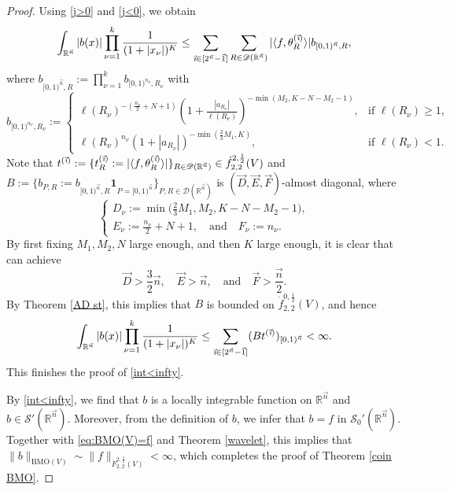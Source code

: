 \documentclass[11pt, reqno]{amsart}
\theoremstyle{definition}
\theoremstyle{remark}
\numberwithin{equation}{section}
\newcommand{\vD}{\vec D}
\newcommand{\vE}{\vec E}
\newcommand{\vF}{\vec F}
\newcommand{\vi}{\vec{\textit{\i}}}
\begin{document}
\begin{proof}
Using \eqref{j>0} and \eqref{j<0}, we obtain
\begin{equation*}
\int_{\mathbb R^{\vec n}} |b(x)| \prod_{\nu=1}^k \frac{1}{(1+|x_\nu|)^K}
\leq \sum_{\vi\in[2^{\vec n}-\vec 1]}
\sum_{R\in \mathscr D(\mathbb R^{\vec n})}
|\langle f, \theta^{(\vi)}_R\rangle|
b_{[0,1)^{\vec n}, R},
\end{equation*}
where $b_{[0,1)^{\vec n}, R}:=\prod_{\nu=1}^k b_{[0,1)^{n_\nu}, R_\nu}$ with
\begin{equation*}
b_{[0,1)^{n_\nu}, R_\nu}:=
\begin{cases}
\displaystyle\ell(R_\nu)^{-(\frac{n_\nu}2 + N+1)}  (1+\frac{|a_{R_\nu}|}{\ell(R_\nu)})^{-\min(M_2,K-N-M_2-1)},
&\text{if } \ell(R_\nu)\geq 1, \\
\ell(R_\nu)^{n_\nu} (1+|a_{R_\nu}|)^{-\min(\frac23M_1,K)},
&\text{if } \ell(R_\nu)< 1.
\end{cases}
\end{equation*}
Note that $t^{(\vi)}:=\{t_R^{(\vi)}:=|\langle f, \theta^{(\vi)}_R\rangle|\}_{R\in\mathscr D(\mathbb R^{\vec n})}
\in \dot f^{2,\frac12}_{2,2}(V)$
and $B:=\{b_{P,R}:= b_{[0,1)^{\vec n}, R} \mathbf 1_{P=[0,1)^{\vec n}}\}_{P,R\in\mathscr D(\mathbb R^{\vec n})}$
is $(\vD,\vE,\vF)$-almost diagonal, where
$$
\begin{cases}
\displaystyle D_\nu:=\min\Big(\frac23 M_1,M_2,K-N-M_2-1\Big),\\
\displaystyle E_\nu:=\frac{n_\nu}2 + N+1, \quad\text{and}\quad
F_\nu:=n_\nu.
\end{cases}
$$
By first fixing $M_1,M_2,N$ large enough, and then $K$ large enough, it is clear that can achieve
$$
\vec D>\frac 32 \vec n,\quad
\vec E>\vec n,\quad\text{and}\quad
\vec F>\frac{\vec n}{2}.
$$
By Theorem \ref{AD st}, this implies that $B$ is bounded on $\dot f^{0,\frac12}_{2,2}(V)$, and hence
$$
\int_{\mathbb R^{\vec n}} |b(x)| \prod_{\nu=1}^k \frac{1}{(1+|x_\nu|)^K}
\leq \sum_{\vi\in[2^{\vec n}-\vec 1]} (B t^{(\vi)})_{[0,1)^{\vec n}}
<\infty.
$$
This finishes the proof of \eqref{int<infty}.

By \eqref{int<infty}, we find that $b$ is a locally integrable function on $\mathbb R^{\vec n}$
and $b\in \mathscr S'(\mathbb R^{\vec n})$.
Moreover, from the definition of $b$, we infer that
$b=f$ in $\mathscr S_0'(\mathbb R^{\vec n})$.
Together with \eqref{eq:BMO(V)=f} and Theorem \ref{wavelet}, this implies that
$\|b\|_{\mathrm{BMO}(V)}\sim\|f\|_{\dot F^{2,\frac12}_{2,2}(V)}<\infty$,
which completes the proof of Theorem \ref{coin BMO}.
\end{proof}
\end{document}
